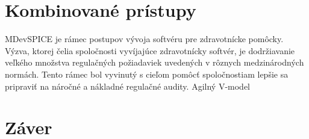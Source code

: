 \documentclass[10pt,twoside,slovak,a4paper]{article}
\begin{document}
\section{Kombinované prístupy}
MDevSPICE je rámec postupov vývoja softvéru pre zdravotnícke pomôcky. Výzva, ktorej čelia spoločnosti vyvíjajúce zdravotnícky softvér, je dodržiavanie veľkého množstva regulačných požiadaviek uvedených v rôznych medzinárodných normách. Tento rámec bol vyvinutý s cieľom pomôcť spoločnostiam lepšie sa pripraviť na náročné a nákladné regulačné audity\cite{mccaffery2019}.
Agilný V-model\cite{mchugh2013}
\section{Záver}



\end{document}
